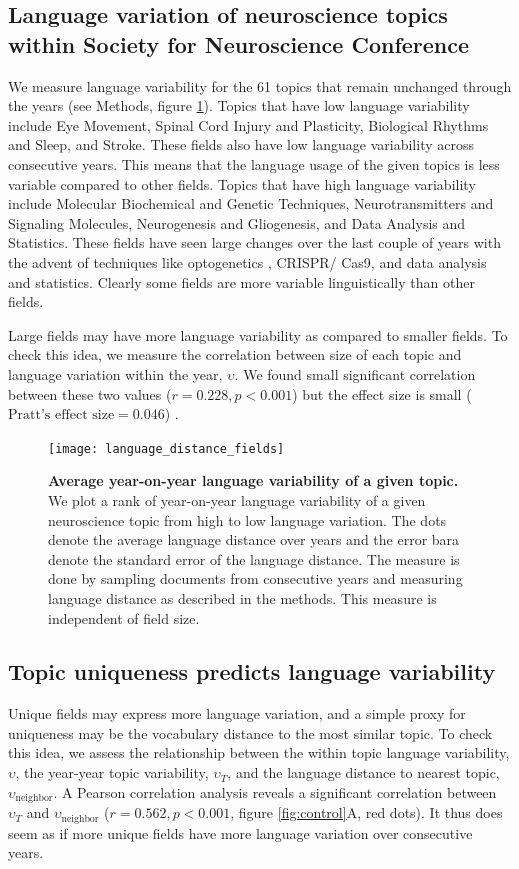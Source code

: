 \documentclass[10pt,letterpaper]{article}
\begin{document}
\subsection*{Language variation of neuroscience topics within Society for Neuroscience Conference}

We measure language variability for the 61 topics that remain unchanged through the years (see Methods, figure \ref{fig:year_year}). Topics that have low language variability include Eye Movement, Spinal Cord Injury and Plasticity, Biological Rhythms and Sleep, and Stroke. These fields also have low language variability across consecutive years. This means that the language usage of the given topics is less variable compared to other fields. Topics that have high language variability include Molecular Biochemical and Genetic Techniques, Neurotransmitters and Signaling Molecules, Neurogenesis and Gliogenesis, and Data Analysis and Statistics. These fields have seen large changes over the last couple of years with the advent of techniques like optogenetics \cite{deisseroth2011optogenetics}, CRISPR/ Cas9, and data analysis and statistics. Clearly some fields are more variable linguistically than other fields.

Large fields may have more language variability as compared to smaller fields. To check this idea, we measure the correlation between size of each topic and language variation within the year, $\upsilon$. We found small significant correlation between these two values ($r = 0.228, p < 0.001$) but the effect size is small ($\text{Pratt's effect size} = 0.046$) \cite{yin2001estimating}.

\begin{figure}[ht]
\centering
\texttt{[image: language\_distance\_fields]}
\caption{\textbf{Average year-on-year language variability of a given topic.} We plot a rank of year-on-year language variability of a given neuroscience topic from high to low language variation. The dots denote the average language distance over years and the error bara denote the standard error of the language distance. The measure is done by sampling documents from consecutive years and measuring language distance as described in the methods. This measure is independent of field size.}
\label{fig:year_year}
\end{figure}

\subsection*{Topic uniqueness predicts language variability}
Unique fields may express more language variation, and a simple proxy for uniqueness may be the vocabulary distance to the most similar topic. To check this idea, we assess the relationship between the within topic language variability, $\upsilon$, the year-year topic variability, $\upsilon_T$, and the language distance to nearest topic, $\upsilon_{\text{neighbor}}$. A Pearson correlation analysis reveals a significant correlation between $\upsilon_T$ and $\upsilon_{\text{neighbor}}$ ($r = 0.562, p < 0.001$, figure \ref{fig:control}A, red dots). It thus does seem as if more unique fields have more language variation over consecutive years.
\end{document}
